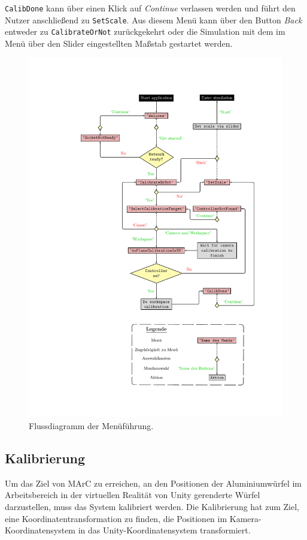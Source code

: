 \texttt{Calib\-Done} kann über einen Klick auf \textit{Continue} verlassen werden und führt den Nutzer anschließend zu \texttt{SetScale}. Aus diesem Menü kann über den Button \textit{Back} entweder zu \texttt{CalibrateOrNot} zurückgekehrt oder die Simulation mit dem im Menü über den Slider eingestellten Maßstab gestartet werden.


\begin{figure}[htbp]
	\centering
	\includegraphics[scale=.9, trim=5.5cm 2.5cm 3.5cm 2.5cm]{kapitel/system/MP_Menu_Flowchart.pdf}
	\caption{Flussdiagramm der Menüführung.}
	\label{fig:menuFlow}
\end{figure}
\subsection{Kalibrierung}\label{sec:calib}
Um das Ziel von MArC zu erreichen, an den Positionen der Aluminiumwürfel im Arbeitsbereich in der virtuellen Realität von Unity gerenderte Würfel darzustellen, muss das System kalibriert werden. Die Kalibrierung hat zum Ziel, eine Koordinatentransformation zu finden, die Positionen im Kamera-Koordinatensystem in das Unity-Koordinatensystem transformiert.

